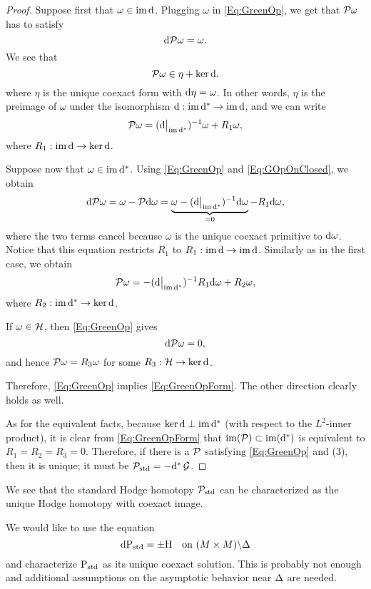\documentclass[\MainFolder/Text.tex]{subfiles}
\begin{document}
\begin{proof}
Suppose first that $\omega \in \operatorname{im}\mathrm{d}$. Plugging $\omega$ in \eqref{Eq:GreenOp}, we get that $\mathcal{P} \omega$ has to satisfy
$$ \mathrm{d} \mathcal{P} \omega = \omega. $$
We see that 
$$ \mathcal{P}\omega \in \eta + \operatorname{ker} \mathrm{d}, $$
where $\eta$ is the unique coexact form with $\mathrm{d} \eta = \omega$. In other words, $\eta$ is the preimage of $\omega$ under the isomorphism $\mathrm{d}: \operatorname{im} \mathrm{d}^* \rightarrow \operatorname{im} \mathrm{d}$, and we can write 
\begin{equation}\label{Eq:GOpOnClosed}
\Htp \omega = (\Restr{\Dd}{\Im \CoDd})^{-1} \omega + R_1 \omega,
\end{equation}
where $R_1: \operatorname{im} \mathrm{d} \rightarrow \operatorname{ker} \mathrm{d}$.

Suppose now that $\omega \in \operatorname{im}\mathrm{d}^*$. Using \eqref{Eq:GreenOp} and \eqref{Eq:GOpOnClosed}, we obtain
$$ \Dd \Htp \omega = \omega - \Htp \Dd \omega = \underbrace{\omega - (\Restr{\Dd}{\Im \CoDd})^{-1} \Dd \omega}_{=0}- R_1 \Dd \omega, $$
where the two terms cancel because $\omega$ is the unique coexact primitive to $\mathrm{d} \omega$. Notice that this equation restricts $R_1$ to $R_1: \operatorname{im} \mathrm{d} \rightarrow \operatorname{im} \mathrm{d}$. Similarly as in the first case, we obtain
$$ \Htp \omega = - (\Restr{\Dd}{\Im\CoDd})^{-1} R_1 \Dd \omega + R_2 \omega, $$
where $R_2: \operatorname{im}\mathrm{d}^* \rightarrow \operatorname{ker} \mathrm{d}$.

If $\omega\in \mathcal{H}$, then \eqref{Eq:GreenOp} gives
$$ \mathrm{d} \mathcal{P} \omega = 0, $$
and hence $\mathcal{P} \omega = R_3 \omega$ for some $R_3: \mathcal{H} \rightarrow \operatorname{ker} \mathrm{d}$.

Therefore, \eqref{Eq:GreenOp} implies \eqref{Eq:GreenOpForm}. The other direction clearly holds as well.



As for the equivalent facts, because $\operatorname{ker} \mathrm{d} \perp \operatorname{im} \mathrm{d}^*$ (with respect to the $L^2$-inner product), it is clear from \eqref{Eq:GreenOpForm} that $\operatorname{im}(\mathcal{P})\subset \operatorname{im}(\mathrm{d}^*)$ is equivalent to $R_1 = R_2 = R_3 = 0$. Therefore, if there is a $\mathcal{P}$ satisfying \eqref{Eq:GreenOp} and (3), then it is unique; it must be $\mathcal{P}_{\mathrm{std}} = -\mathrm{d}^*\operatorname{\mathcal{G}}$.  
\end{proof}

We see that the standard Hodge homotopy $\mathcal{P}_{\mathrm{std}}$ can be characterized as the unique Hodge homotopy with coexact image.

We would like to use the equation
\begin{equation}\label{Eq:DFGDFG}
\mathrm{d} \mathrm{P}_{\mathrm{std}} = \pm \mathrm{H} \quad\text{on }(M\times M)\backslash\Delta 
\end{equation}
and characterize $\mathrm{P}_{\mathrm{std}}$ as its unique coexact solution. This is probably not enough and additional assumptions on the asymptotic behavior near $\Delta$ are needed.
\end{document}
